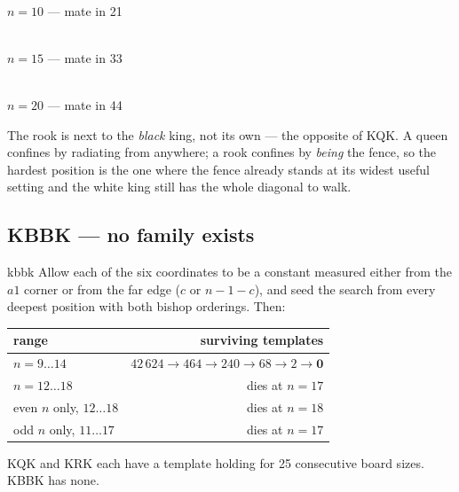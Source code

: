 \documentclass[11pt]{article}
\begin{document}
\begin{center}
\begin{minipage}{0.31\textwidth}\centering
  \\[1.5mm]
  {\small $n=10$ --- mate in 21}
\end{minipage}\hfill
\begin{minipage}{0.31\textwidth}\centering
  \\[1.5mm]
  {\small $n=15$ --- mate in 33}
\end{minipage}\hfill
\begin{minipage}{0.31\textwidth}\centering
  \\[1.5mm]
  {\small $n=20$ --- mate in 44}
\end{minipage}
\end{center}

\medskip

\noindent
The rook is next to the \emph{black} king, not its own --- the opposite of KQK.
A queen confines by radiating from anywhere; a rook confines by \emph{being} the
fence, so the hardest position is the one where the fence already stands at its
widest useful setting and the white king still has the whole diagonal to walk.

\subsection{KBBK --- no family exists}\label{sub:kbbk-family}

\begin{result}[title={An exhaustive search that finds nothing}]{kbbk}
Allow each of the six coordinates to be a constant measured either from the
$a1$ corner or from the far edge ($c$ or $n-1-c$), and seed the search from
every deepest position with both bishop orderings. Then:

\smallskip
\begin{center}\small
\begin{tabular}{@{}lr@{}}
\toprule
range & surviving templates \\
\midrule
$n = 9\ldots14$          & $42\,624 \to 464 \to 240 \to 68 \to 2 \to \mathbf{0}$ \\
$n = 12\ldots18$         & dies at $n=17$ \\
even $n$ only, $12\ldots18$ & dies at $n=18$ \\
odd $n$ only, $11\ldots17$  & dies at $n=17$ \\
\bottomrule
\end{tabular}
\end{center}

\smallskip
KQK and KRK each have a template holding for 25 consecutive board sizes.
KBBK has none.
\end{result}
\end{document}
